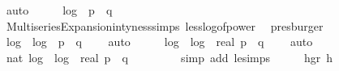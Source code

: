 \begin{isabellebody}
\ auto\isanewline
\ \ \isamarkupfalse%
\ \isamarkupfalse%
\ {\isachardoublequoteopen}log\ {}\ {\isacharparenleft}{\kern0pt}p\ {\isacharasterisk}{\kern0pt}\ q{\isacharparenright}{\kern0pt}\ {\isachargreater}{\kern0pt}\ {}{\isachardoublequoteclose}\ \isanewline
\ \ \ \ \isamarkupfalse%
\ Multiseries{\isacharunderscore}{\kern0pt}Expansion{\isachardot}{\kern0pt}intyness{\isacharunderscore}{\kern0pt}simps{\isacharparenleft}{\kern0pt}{}{\isacharparenright}{\kern0pt}\ less{\isacharunderscore}{\kern0pt}log{}{\isacharunderscore}{\kern0pt}of{\isacharunderscore}{\kern0pt}power\ \isamarkupfalse%
\ presburger\isanewline
\ \ \isamarkupfalse%
\ \isamarkupfalse%
\ {\isachardoublequoteopen}log\ {}\ {\isacharparenleft}{\kern0pt}log\ {}\ {\isacharparenleft}{\kern0pt}p\ {\isacharasterisk}{\kern0pt}\ q{\isacharparenright}{\kern0pt}{\isacharparenright}{\kern0pt}\ {\isachargreater}{\kern0pt}\ {}{\isachardoublequoteclose}\ \isamarkupfalse%
\ auto\isanewline
\ \ \isamarkupfalse%
\ \isamarkupfalse%
\ {\isachardoublequoteopen}{\isasymlfloor}log\ {}\ {\isacharparenleft}{\kern0pt}log\ {}\ {\isacharparenleft}{\kern0pt}real\ {\isacharparenleft}{\kern0pt}p\ {\isacharasterisk}{\kern0pt}\ q{\isacharparenright}{\kern0pt}{\isacharparenright}{\kern0pt}{\isacharparenright}{\kern0pt}{\isasymrfloor}\ {\isasymge}\ {}{\isachardoublequoteclose}\ \isamarkupfalse%
\ auto\isanewline
\ \ \isamarkupfalse%
\ \isamarkupfalse%
\ {\isachardoublequoteopen}nat\ {\isasymlfloor}log\ {}\ {\isacharparenleft}{\kern0pt}log\ {}\ {\isacharparenleft}{\kern0pt}real\ {\isacharparenleft}{\kern0pt}p\ {\isacharasterisk}{\kern0pt}\ q{\isacharparenright}{\kern0pt}{\isacharparenright}{\kern0pt}{\isacharparenright}{\kern0pt}{\isasymrfloor}\ {\isasymge}\ {}{\isachardoublequoteclose}\ \isanewline
\ \ \ \ \isamarkupfalse%
\ {\isacharparenleft}{\kern0pt}simp\ add{\isacharcolon}{\kern0pt}\ le{\isacharunderscore}{\kern0pt}simps{\isacharparenleft}{\kern0pt}{}{\isacharparenright}{\kern0pt}{\isacharparenright}{\kern0pt}\isanewline
\ \ \isamarkupfalse%
\ \isamarkupfalse%
\ h{\isacharunderscore}{\kern0pt}gr{\isacharunderscore}{\kern0pt}{}{\isacharcolon}{\kern0pt}\ {\isachardoublequoteopen}h\ {\isasymge}\ {}{\isachardoublequoteclose}\ \isamarkupfalse%

\end{isabellebody}
